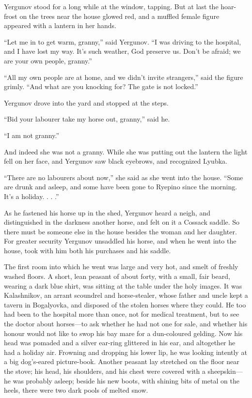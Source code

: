 Yergunov stood for a long while at the window, tapping. But at last the
hoar-frost on the trees near the house glowed red, and a muffled female
figure appeared with a lantern in her hands.

“Let me in to get warm, granny,” said Yergunov. “I was driving to the
hospital, and I have lost my way. It’s such weather, God preserve us.
Don’t be afraid; we are your own people, granny.”

“All my own people are at home, and we didn’t invite strangers,” said
the figure grimly. “And what are you knocking for? The gate is not
locked.”

Yergunov drove into the yard and stopped at the steps.

“Bid your labourer take my horse out, granny,” said he.

“I am not granny.”

And indeed she was not a granny. While she was putting out the lantern
the light fell on her face, and Yergunov saw black eyebrows, and
recognized Lyubka.

“There are no labourers about now,” she said as she went into the house.
“Some are drunk and asleep, and some have been gone to Ryepino since the
morning. It’s a holiday. . . .”

As he fastened his horse up in the shed, Yergunov heard a neigh, and
distinguished in the darkness another horse, and felt on it a Cossack
saddle. So there must be someone else in the house besides the woman and
her daughter. For greater security Yergunov unsaddled his horse, and
when he went into the house, took with him both his purchases and his
saddle.

The first room into which he went was large and very hot, and smelt of
freshly washed floors. A short, lean peasant of about forty, with a
small, fair beard, wearing a dark blue shirt, was sitting at the table
under the holy images. It was Kalashnikov, an arrant scoundrel and
horse-stealer, whose father and uncle kept a tavern in Bogalyovka, and
disposed of the stolen horses where they could. He too had been to the
hospital more than once, not for medical treatment, but to see the
doctor about horses—to ask whether he had not one for sale, and whether
his honour would not like to swop his bay mare for a dun-coloured
gelding. Now his head was pomaded and a silver ear-ring glittered in his
ear, and altogether he had a holiday air. Frowning and dropping his
lower lip, he was looking intently at a big dog’s-eared picture-book.
Another peasant lay stretched on the floor near the stove; his head, his
shoulders, and his chest were covered with a sheepskin—he was probably
asleep; beside his new boots, with shining bits of metal on the heels,
there were two dark pools of melted snow.


